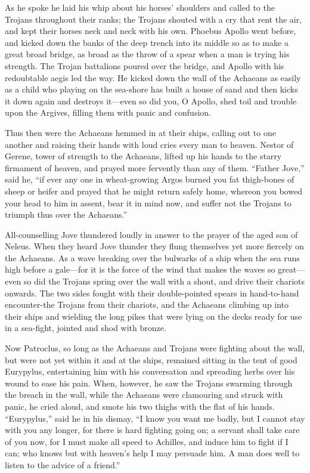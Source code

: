 As he spoke he laid his whip about his horses’ shoulders and called to the
Trojans throughout their ranks; the Trojans shouted with a cry that rent
the air, and kept their horses neck and neck with his own. Phoebus Apollo
went before, and kicked down the banks of the deep trench into its middle
so as to make a great broad bridge, as broad as the throw of a spear when
a man is trying his strength. The Trojan battalions poured over the
bridge, and Apollo with his redoubtable aegis led the way. He kicked down
the wall of the Achaeans as easily as a child who playing on the sea-shore
has built a house of sand and then kicks it down again and destroys it—even
so did you, O Apollo, shed toil and trouble upon the Argives, filling them
with panic and confusion.

Thus then were the Achaeans hemmed in at their ships, calling out to one
another and raising their hands with loud cries every man to heaven.
Nestor of Gerene, tower of strength to the Achaeans, lifted up his hands
to the starry firmament of heaven, and prayed more fervently than any of
them. “Father Jove,” said he, “if ever any one in wheat-growing Argos
burned you fat thigh-bones of sheep or heifer and prayed that he might
return safely home, whereon you bowed your head to him in assent, bear it
in mind now, and suffer not the Trojans to triumph thus over the
Achaeans.”

All-counselling Jove thundered loudly in answer to the prayer of the aged
son of Neleus. When they heard Jove thunder they flung themselves yet more
fiercely on the Achaeans. As a wave breaking over the bulwarks of a ship
when the sea runs high before a gale—for it is the force of the wind
that makes the waves so great—even so did the Trojans spring over
the wall with a shout, and drive their chariots onwards. The two sides
fought with their double-pointed spears in hand-to-hand encounter-the
Trojans from their chariots, and the Achaeans climbing up into their ships
and wielding the long pikes that were lying on the decks ready for use in
a sea-fight, jointed and shod with bronze.

Now Patroclus, so long as the Achaeans and Trojans were fighting about the
wall, but were not yet within it and at the ships, remained sitting in the
tent of good Eurypylus, entertaining him with his conversation and
spreading herbs over his wound to ease his pain. When, however, he saw the
Trojans swarming through the breach in the wall, while the Achaeans were
clamouring and struck with panic, he cried aloud, and smote his two thighs
with the flat of his hands. “Eurypylus,” said he in his dismay, “I know
you want me badly, but I cannot stay with you any longer, for there is
hard fighting going on; a servant shall take care of you now, for I must
make all speed to Achilles, and induce him to fight if I can; who knows
but with heaven’s help I may persuade him. A man does well to listen to
the advice of a friend.”

